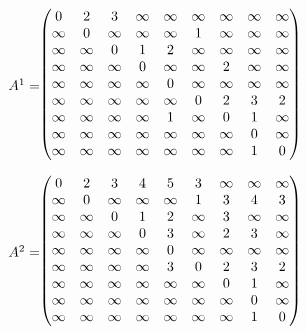 \documentclass[12pt,a4paper]{article}
\begin{document}
\begin{figure}[H]
\centering
\begin{minipage}{0.46\textwidth}
\centering
\footnotesize
$\vcenter{\hbox{$A^1 = $}}\hspace{-0.07cm} \begin{pmatrix}
0 & 2 & 3 & \infty & \infty & \infty & \infty & \infty & \infty \\
\infty & 0 & \infty & \infty & \infty & 1 & \infty & \infty & \infty \\
\infty & \infty & 0 & 1 & 2 & \infty & \infty & \infty & \infty \\
\infty & \infty & \infty & 0 & \infty & \infty & 2 & \infty & \infty \\
\infty & \infty & \infty & \infty & 0 & \infty & \infty & \infty & \infty \\
\infty & \infty & \infty & \infty & \infty & 0 & 2 & 3 & 2 \\
\infty & \infty & \infty & \infty & 1 & \infty & 0 & 1 & \infty \\
\infty & \infty & \infty & \infty & \infty & \infty & \infty & 0 & \infty \\
\infty & \infty & \infty & \infty & \infty & \infty & \infty & 1 & 0
\end{pmatrix}$
\end{minipage}
\hspace{1cm}
\begin{minipage}{0.46\textwidth}
\centering
\footnotesize
$\vcenter{\hbox{$A^2 = $}}\hspace{-0.07cm} \begin{pmatrix}
0 & 2 & 3 & 4 & 5 & 3 & \infty & \infty & \infty \\
\infty & 0 & \infty & \infty & \infty & 1 & 3 & 4 & 3 \\
\infty & \infty & 0 & 1 & 2 & \infty & 3 & \infty  & \infty \\
\infty & \infty & \infty & 0 & 3 & \infty & 2 & 3 & \infty \\
\infty & \infty & \infty & \infty & 0 & \infty & \infty & \infty & \infty \\
\infty & \infty & \infty & \infty & 3 & 0 & 2 & 3 & 2 \\
\infty & \infty & \infty & \infty & \infty & \infty & 0 & 1 & \infty \\
\infty & \infty & \infty & \infty & \infty & \infty & \infty & 0 & \infty \\
\infty & \infty & \infty & \infty & \infty & \infty & \infty & 1 & 0
\end{pmatrix}$
\end{minipage}
\end{figure}
\end{document}
